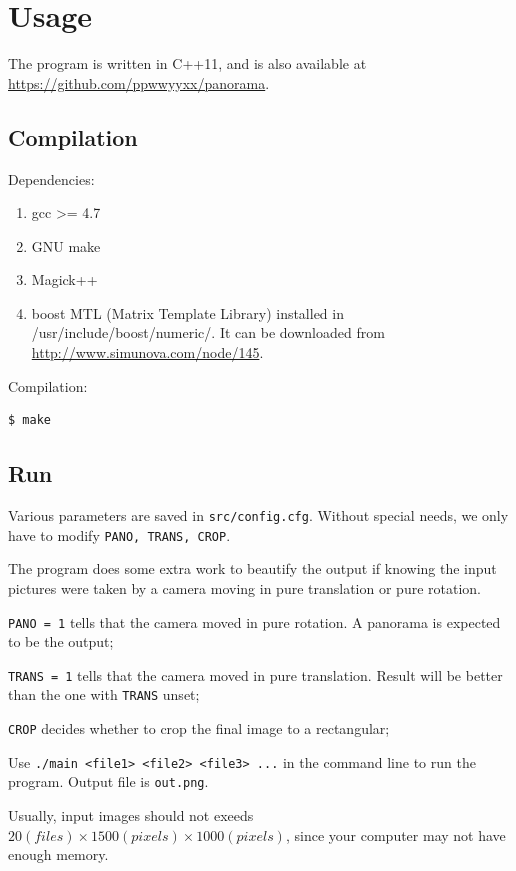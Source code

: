 \section{Usage}
The program is written in C++11, and is also available at \url{https://github.com/ppwwyyxx/panorama}.

\subsection{Compilation}
Dependencies:

\begin{enumerate}
    \item gcc >= 4.7
    \item GNU make
    \item Magick++
    \item boost MTL (Matrix Template Library) installed in /usr/include/boost/numeric/.
      It can be downloaded from \url{http://www.simunova.com/node/145}.
\end{enumerate}

Compilation:
\begin{lstlisting}
$ make
\end{lstlisting}

\subsection{Run}
Various parameters are saved in \verb|src/config.cfg|.
Without special needs, we only have to modify \verb|PANO, TRANS, CROP|.

The program does some extra work to beautify the output
if knowing the input pictures were taken by a camera
moving in pure translation or pure rotation.

\verb|PANO = 1| tells that the camera moved in pure rotation. A panorama is expected to be the output;

\verb|TRANS = 1| tells that the camera moved in pure translation. Result will be better than the one with \verb|TRANS| unset;

\verb|CROP| decides whether to crop the final image to a rectangular;

Use \verb|./main <file1> <file2> <file3> ...| in the command line to run the program.
Output file is \verb|out.png|.

Usually, input images should not exeeds $20(files)\times 1500(pixels) \times 1000(pixels)$, since your computer may not have enough memory.

